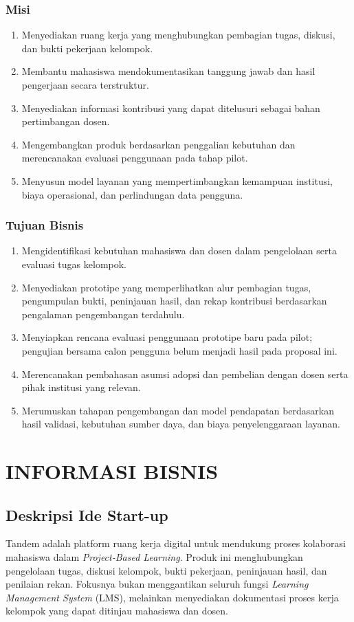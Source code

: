 \documentclass[12pt,a4paper,oneside]{report}
\begin{document}
\subsection{Misi}
\begin{enumerate}
\item Menyediakan ruang kerja yang menghubungkan pembagian tugas, diskusi, dan bukti pekerjaan kelompok.
\item Membantu mahasiswa mendokumentasikan tanggung jawab dan hasil pengerjaan secara terstruktur.
\item Menyediakan informasi kontribusi yang dapat ditelusuri sebagai bahan pertimbangan dosen.
\item Mengembangkan produk berdasarkan penggalian kebutuhan dan merencanakan evaluasi penggunaan pada tahap pilot.
\item Menyusun model layanan yang mempertimbangkan kemampuan institusi, biaya operasional, dan perlindungan data pengguna.
\end{enumerate}

\subsection{Tujuan Bisnis}
\begin{enumerate}
\item Mengidentifikasi kebutuhan mahasiswa dan dosen dalam pengelolaan serta evaluasi tugas kelompok.
\item Menyediakan prototipe yang memperlihatkan alur pembagian tugas, pengumpulan bukti, peninjauan hasil, dan rekap kontribusi berdasarkan pengalaman pengembangan terdahulu.
\item Menyiapkan rencana evaluasi penggunaan prototipe baru pada pilot; pengujian bersama calon pengguna belum menjadi hasil pada proposal ini.
\item Merencanakan pembahasan asumsi adopsi dan pembelian dengan dosen serta pihak institusi yang relevan.
\item Merumuskan tahapan pengembangan dan model pendapatan berdasarkan hasil validasi, kebutuhan sumber daya, dan biaya penyelenggaraan layanan.
\end{enumerate}

\chapter{INFORMASI BISNIS}
\section{Deskripsi Ide Start-up}
Tandem adalah platform ruang kerja digital untuk mendukung proses kolaborasi mahasiswa dalam \textit{Project-Based Learning}. Produk ini menghubungkan pengelolaan tugas, diskusi kelompok, bukti pekerjaan, peninjauan hasil, dan penilaian rekan. Fokusnya bukan menggantikan seluruh fungsi \textit{Learning Management System} (LMS), melainkan menyediakan dokumentasi proses kerja kelompok yang dapat ditinjau mahasiswa dan dosen.
\end{document}
